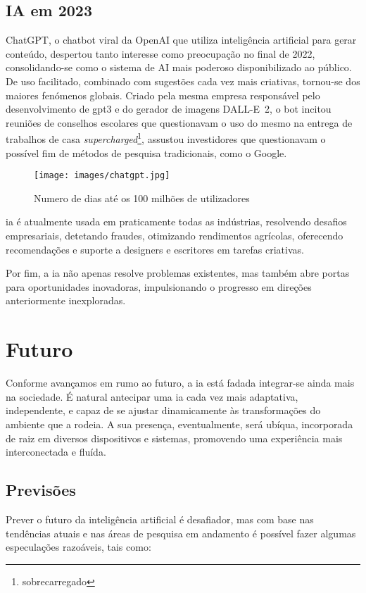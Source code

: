 \documentclass[a4paper, 11pt, onecolumn, oneside]{report}
\begin{document}
\subsection{IA em 2023}
ChatGPT\cite{chatpgt}, o chatbot viral da OpenAI que utiliza inteligência artificial para gerar conteúdo, despertou tanto interesse como preocupação no final de 2022, consolidando-se como o sistema de AI mais poderoso disponibilizado ao público. De uso facilitado, combinado com sugestões cada vez mais criativas, tornou-se dos maiores fenómenos globais. Criado pela mesma empresa responsável pelo desenvolvimento de \ac{gpt3} e do gerador de imagens \mbox{DALL-E 2}, o bot incitou reuniões de conselhos escolares que questionavam o uso do mesmo na entrega de trabalhos de casa \textit{supercharged}\footnote{sobrecarregado}, assustou investidores que questionavam o possível fim de métodos de pesquisa tradicionais, como o Google.
%
\begin{figure}[ht]
    \centering
    \texttt{[image: images/chatgpt.jpg]}
    \caption{Numero de dias até os 100 milhões de utilizadores\cite{i22}}
    \label{chatgpt_user_count}
\end{figure}
%
\par
\ac{ia} é atualmente usada em praticamente todas as indústrias, resolvendo desafios empresariais, detetando fraudes, otimizando rendimentos agrícolas, oferecendo recomendações e suporte a designers e escritores em tarefas criativas.  
\par
Por fim, a \ac{ia} não apenas resolve problemas existentes, mas também abre portas para oportunidades inovadoras, impulsionando o progresso em direções anteriormente inexploradas.


\section{Futuro}
Conforme avançamos em rumo ao futuro, a \ac{ia} está fadada integrar-se ainda mais na sociedade. É natural antecipar uma \ac{ia} cada vez mais adaptativa, independente, e capaz de se ajustar dinamicamente às transformações do ambiente que a rodeia. A sua presença, eventualmente, será ubíqua, incorporada de raiz em diversos dispositivos e sistemas, promovendo uma experiência mais interconectada e fluída.

\subsection{Previsões}
Prever o futuro da inteligência artificial é desafiador, mas com base nas tendências atuais e nas áreas de pesquisa em andamento é possível fazer algumas especulações razoáveis, tais como:
\end{document}
